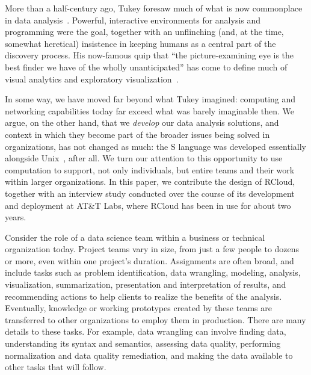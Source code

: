 
\maketitle

More than a half-century ago, Tukey foresaw
much of what is now commonplace in data analysis~\cite{TukeyFDA}.
Powerful, interactive environments for analysis and programming were
the goal, together with an unflinching (and, at the time, somewhat
heretical) insistence in keeping humans as a central part of the
discovery process. His now-famous quip that ``the picture-examining eye is the
best finder we have of the wholly unanticipated'' has come to define
much of visual analytics and exploratory visualization~\cite{TukeyEDA}.

In some way, we have moved far beyond what Tukey imagined:
computing and networking capabilities today far exceed
what was barely imaginable then. 
We argue, on the other hand, that we \emph{develop} our data analysis
solutions, and context in which they become part of the broader issues
being solved in organizations, has not changed as much: the S language
was developed essentially alongside Unix~\cite{TheSSystem}, after all.
We turn our attention to this opportunity to use computation
to support, not only individuals, but entire teams and their
work within larger organizations. In this paper, we contribute the
design of RCloud, together with an interview study conducted over the
course of its development and deployment at AT\&T Labs, where RCloud has
been in use for about two years.

Consider the role of a data science team within
a business or technical organization today.
Project teams vary in size, from just a few people to dozens or
more, even within one project's duration. Assignments are often
broad, and include tasks such as problem identification,
data wrangling, modeling, analysis, visualization, summarization,
presentation and interpretation of results, and recommending
actions to help clients to realize the benefits of the analysis.
Eventually, knowledge or working prototypes created by these teams
are transferred to other organizations to employ them in production.
There are many details to these tasks. For example, data wrangling can involve
finding data, understanding its syntax and semantics, assessing data quality,
performing normalization and data quality remediation, and making the data
available to other tasks that will follow.

